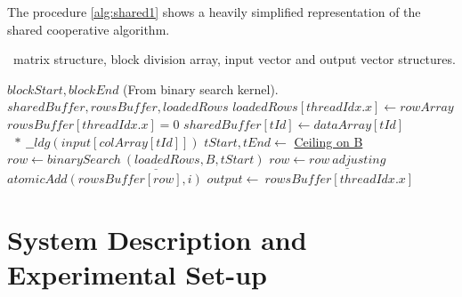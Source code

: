 \documentclass[conference]{IEEEtran}
\begin{document}
The procedure \ref{alg:shared1} shows a heavily simplified representation of the shared cooperative algorithm.
\begin{algorithm}[h!]
\small
\caption{Shared cooperative algorithm}
\algorithmicrequire~matrix structure, block division array, input vector and output vector structures.
\begin{algorithmic}[1]
\State $blockStart, blockEnd$ \Comment(From binary search kernel).
\State $sharedBuffer, rowsBuffer, loadedRows$
\State $loadedRows[threadIdx.x]\leftarrow rowArray$
\State $rowsBuffer[threadIdx.x]=0$
\EndIf
{}
\State $sharedBuffer[tId] \leftarrow dataArray[tId]$
\State $\ \ *\ \_\_ldg(input[colArray[tId]])$
\EndFor
\State $tStart,tEnd\leftarrow$ \underline{Ceiling on B}
\State $row\leftarrow \underline{binarySearch\ (loadedRows,B,tStart)}$
\State $row\leftarrow\underline{row\ adjusting}$
\State $atomicAdd(rowsBuffer[row],i)$
\EndFor
\EndFor
{}
\State $output\leftarrow\ rowsBuffer[threadIdx.x]$
\EndIf
\EndFor
\EndProcedure
\end{algorithmic}
\label{alg:shared1}
\end{algorithm}

\section{System Description and Experimental Set-up}
\end{document}
